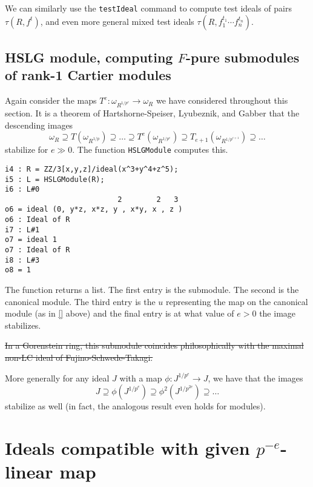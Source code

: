 \documentclass{amsart}
\begin{document}
We can similarly use the \texttt{testIdeal} command to compute test ideals of pairs $\tau(R, f^t)$, and even more general mixed test ideals $\tau(R, f_1^{t_1} \cdots f_n^{t_n})$.

\subsection{HSLG module, computing $F$-pure submodules of rank-1 Cartier modules}

Again consider the maps $T^e : \omega_{R^{1/p^e}} \to \omega_R$ we have considered throughout this section.  It is a theorem of Hartshorne-Speiser, Lyubeznik, and Gabber \cite{HartshorneSpeiserLocalCohomologyInCharacteristicP,LyubeznikFModulesApplicationsToLocalCohomology,Gabber.tStruc} that the descending images
\[
\omega_R \supseteq T(\omega_{R^{1/p}}) \supseteq \dots \supseteq T^e(\omega_{R^{1/p^e}}) \supseteq T_{e+1}(\omega_{R^{1/p^{e+1}}}) \supseteq \dots
\]
stabilize for $e \gg 0$.  The function \texttt{HSLGModule} computes this.

\medskip
\begin{verbatim}
i4 : R = ZZ/3[x,y,z]/ideal(x^3+y^4+z^5);
i5 : L = HSLGModule(R);
i6 : L#0
                          2        2   3
o6 = ideal (0, y*z, x*z, y , x*y, x , z )
o6 : Ideal of R
i7 : L#1
o7 = ideal 1
o7 : Ideal of R
i8 : L#3
o8 = 1
\end{verbatim}
\medskip

The function returns a list.  The first entry is the submodule.  The second is the canonical module.  The third entry is the $u$ representing the map on the canonical module (as in \autoref{} above)
and the final entry is at what value of $e > 0$ the image stabilizes.

\bigskip\sout{In a Gorenstein ring, this submodule coincides philosophically with the maximal non-LC ideal of Fujino-Schwede-Takagi.}

More generally for any ideal $J$ with a map $\phi : J^{1/p^e} \to J$, we have that the images
\[
J \supseteq \phi(J^{1/p^e}) \supseteq \phi^2(J^{1/p^{2e}}) \supseteq \dots
\]
stabilize as well (in fact, the analogous result even holds for modules).


\section{Ideals compatible with given $p^{-e}$-linear map}\label{Section: compatible ideals}
\end{document}
